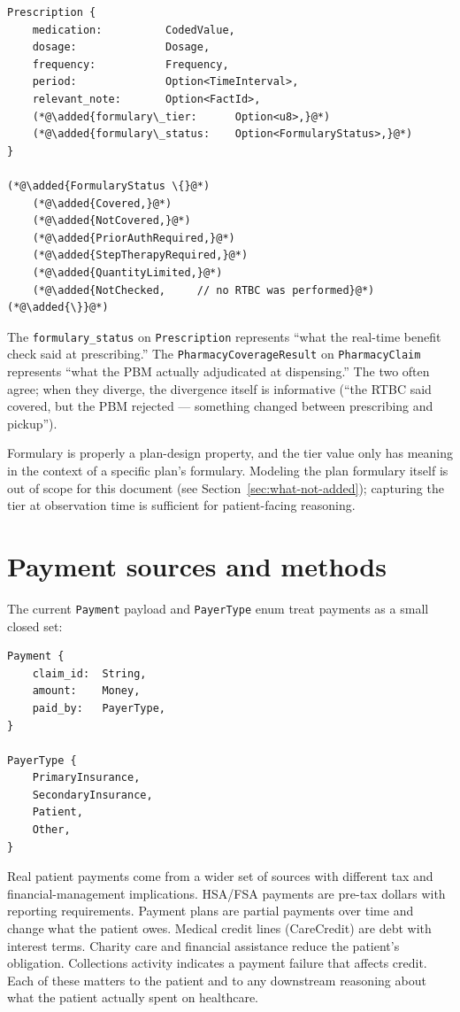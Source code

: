 \documentclass[11pt]{article}
\newcommand{\added}[1]{\textcolor{accentblue}{#1}}
\begin{document}
\begin{lstlisting}
Prescription {
    medication:          CodedValue,
    dosage:              Dosage,
    frequency:           Frequency,
    period:              Option<TimeInterval>,
    relevant_note:       Option<FactId>,
    (*@\added{formulary\_tier:      Option<u8>,}@*)
    (*@\added{formulary\_status:    Option<FormularyStatus>,}@*)
}

(*@\added{FormularyStatus \{}@*)
    (*@\added{Covered,}@*)
    (*@\added{NotCovered,}@*)
    (*@\added{PriorAuthRequired,}@*)
    (*@\added{StepTherapyRequired,}@*)
    (*@\added{QuantityLimited,}@*)
    (*@\added{NotChecked,     // no RTBC was performed}@*)
(*@\added{\}}@*)
\end{lstlisting}

The \texttt{formulary\_status} on \texttt{Prescription} represents
``what the real-time benefit check said at prescribing.'' The
\texttt{PharmacyCoverageResult} on \texttt{PharmacyClaim} represents
``what the PBM actually adjudicated at dispensing.'' The two often
agree; when they diverge, the divergence itself is informative
(``the RTBC said covered, but the PBM rejected --- something changed
between prescribing and pickup'').

Formulary is properly a plan-design property, and the tier value only
has meaning in the context of a specific plan's formulary. Modeling
the plan formulary itself is out of scope for this document
(see Section~\ref{sec:what-not-added}); capturing the tier at
observation time is sufficient for patient-facing reasoning.

\section{Payment sources and methods}
\label{sec:payment-sources}

The current \texttt{Payment} payload and \texttt{PayerType} enum treat
payments as a small closed set:

\begin{lstlisting}
Payment {
    claim_id:  String,
    amount:    Money,
    paid_by:   PayerType,
}

PayerType {
    PrimaryInsurance,
    SecondaryInsurance,
    Patient,
    Other,
}
\end{lstlisting}

Real patient payments come from a wider set of sources with different
tax and financial-management implications. HSA/FSA payments are pre-tax
dollars with reporting requirements. Payment plans are partial payments
over time and change what the patient owes. Medical credit lines
(CareCredit) are debt with interest terms. Charity care and financial
assistance reduce the patient's obligation. Collections activity
indicates a payment failure that affects credit. Each of these matters
to the patient and to any downstream reasoning about what the patient
actually spent on healthcare.
\end{document}
